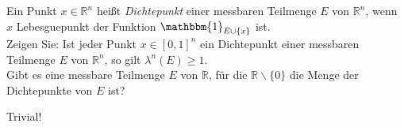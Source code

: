 \begin{exercise}

Ein Punkt $x \in \mathbb{R}^n$ heißt \textit{Dichtepunkt} einer messbaren Teilmenge $E$ von $\mathbb{R}^n$, wenn $x$ Lebesguepunkt der Funktion $\mathbbm{1}_{E\cup\{x\}}$ ist. \\

Zeigen Sie: Ist jeder Punkt $x \in [0,1]^n$ ein Dichtepunkt einer messbaren Teilmenge $E$ von $\mathbb{R}^n$, so gilt $\lambda^n(E) \geq 1$. \\

Gibt es eine messbare Teilmenge $E$ von $\mathbb{R}$, für die $\mathbb{R}\backslash\{0\}$ die Menge der Dichtepunkte von $E$ ist?

\end{exercise}

\begin{solution}

Trivial!

\end{solution}
